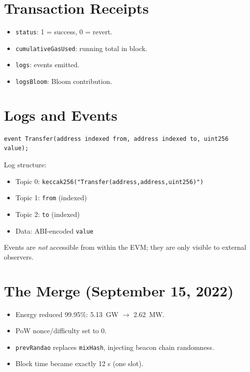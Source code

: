 \documentclass[12pt,a4paper,openany]{book}
\theoremstyle{definition}
\theoremstyle{plain}
\theoremstyle{remark}
\begin{document}
\section{Transaction Receipts}

\begin{itemize}
  \item \texttt{status}: 1 = success, 0 = revert.
  \item \texttt{cumulativeGasUsed}: running total in block.
  \item \texttt{logs}: events emitted.
  \item \texttt{logsBloom}: Bloom contribution.
\end{itemize}

\section{Logs and Events}

\begin{lstlisting}[language=Solidity]
event Transfer(address indexed from, address indexed to, uint256 value);
\end{lstlisting}

Log structure:
\begin{itemize}
  \item Topic 0: \texttt{keccak256("Transfer(address,address,uint256)")}
  \item Topic 1: \texttt{from} (indexed)
  \item Topic 2: \texttt{to} (indexed)
  \item Data: ABI-encoded \texttt{value}
\end{itemize}

Events are \emph{not} accessible from within the EVM; they are only
visible to external observers.

\section{The Merge (September 15, 2022)}

\begin{itemize}
  \item Energy reduced 99.95\%: 5.13~GW $\to$ 2.62~MW.
  \item PoW nonce/difficulty set to 0.
  \item \texttt{prevRandao} replaces \texttt{mixHash}, injecting beacon
        chain randomness.
  \item Block time became exactly 12 s (one slot).
\end{itemize}
\end{document}
